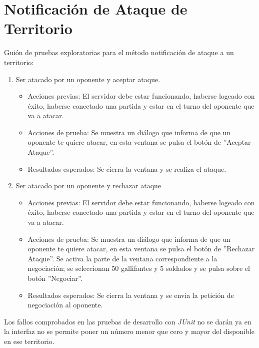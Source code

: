 \section{Notificación de Ataque de Territorio}

Guión de pruebas exploratorias para el método notificación de ataque a un territorio:

\begin{enumerate}
\item Ser atacado por un oponente y aceptar ataque.
	\begin{itemize}
	\item Acciones previas: El servidor debe estar funcionando, haberse logeado con éxito, haberse conectado una partida y estar en el turno del oponente que va a atacar.
	\item Acciones de prueba: Se muestra un diálogo que informa de que un oponente te quiere atacar, en esta ventana se pulsa el botón de ''Aceptar Ataque''.
	\item Resultados esperados: Se cierra la ventana y se realiza el ataque.
	\end{itemize}
	
\item  Ser atacado por un oponente y rechazar ataque
	\begin{itemize}
	\item Acciones previas: El servidor debe estar funcionando, haberse logeado con éxito, haberse conectado una partida y estar en el turno del oponente que va a atacar.
	\item Acciones de prueba: Se muestra un diálogo que informa de que un oponente te quiere atacar, en esta ventana se pulsa el botón de ''Rechazar Ataque''. Se activa la parte de la ventana correspondiente a la negociación; se seleccionan 50 gallifantes y 5 soldados y se pulsa sobre el botón ''Negociar''.
	\item Resultados esperados: Se cierra la ventana y se envia la petición de negociación al oponente.
	\end{itemize}
\end{enumerate}

Los fallos comprobados en las pruebas de desarrollo con \textit{JUnit} no se darán ya en la interfaz no se permite poner un número menor que cero y mayor del disponible en ese territorio.